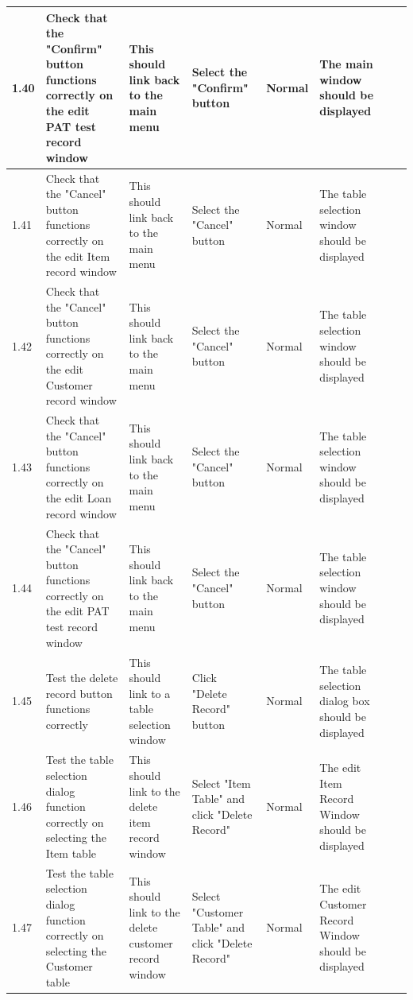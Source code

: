 \begin{landscape}
\begin{center}
\begin{longtable}{|p{1.5cm}|p{2cm}|p{3cm}|p{2cm}|p{2cm}|p{2.5cm}|p{2cm}|p{2cm}|}
        1.40 & Check that the "Confirm" button functions correctly on the edit PAT test record window & This should link back to the main menu & Select the "Confirm" 
        button & Normal & The main window should be displayed & & \\ \hline
        
        1.41 & Check that the "Cancel" button functions correctly on the edit Item record window & This should link back to the main menu & Select the "Cancel" 
        button & Normal & The table selection window should be displayed & & \\ \hline
        
        1.42 & Check that the "Cancel" button functions correctly on the edit Customer record window & This should link back to the main menu & Select the "Cancel" 
        button & Normal & The table selection window should be displayed & & \\ \hline
        
        1.43 & Check that the "Cancel" button functions correctly on the edit Loan record window & This should link back to the main menu & Select the "Cancel" 
        button & Normal & The table selection window should be displayed & & \\ \hline
        
        1.44 & Check that the "Cancel" button functions correctly on the edit PAT test record window & This should link back to the main menu & Select the "Cancel" 
        button & Normal & The table selection window should be displayed & & \\ \hline
        
        1.45 & Test the delete record button functions correctly & This should link to a table selection window & Click "Delete Record" button & Normal & The table
        selection dialog box should be displayed & & \\ \hline 
        
        1.46 & Test the table selection dialog function correctly on selecting the Item table & This should link to the delete item record window & Select "Item Table" 
        and click "Delete Record" & Normal & The edit Item Record Window should be displayed & & \\ \hline
        
        1.47 & Test the table selection dialog function correctly on selecting the Customer table & This should link to the delete customer record window & Select 
        "Customer Table" and click "Delete Record" & Normal & The edit Customer Record Window should be displayed & & \\ \hline


\end{longtable}
\end{center}
\end{landscape}
